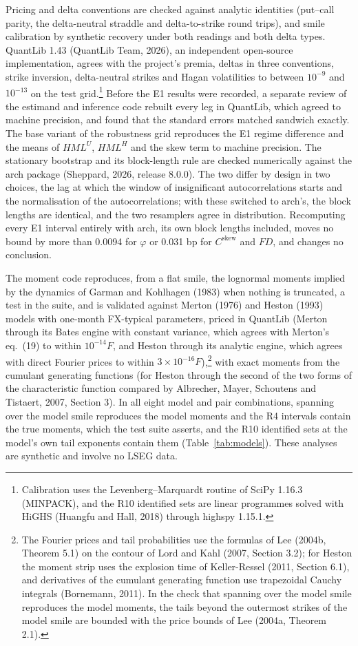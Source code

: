 \documentclass[11pt]{article}
\theoremstyle{result}
\newcommand{\HML}{\mathit{HML}}
\newcommand{\FD}{\mathit{FD}}
\newcommand{\Cskew}{C^{\mathrm{skew}}}
\begin{document}
Pricing and delta conventions are checked against analytic identities (put--call parity, the delta-neutral straddle and delta-to-strike round trips), and smile calibration by synthetic recovery under both readings and both delta types. QuantLib 1.43 (QuantLib Team, 2026), an independent open-source implementation, agrees with the project's premia, deltas in three conventions, strike inversion, delta-neutral strikes and Hagan volatilities to between $10^{-9}$ and $10^{-13}$ on the test grid.\footnote{Calibration uses the Levenberg--Marquardt routine of SciPy 1.16.3 (MINPACK), and the R10 identified sets are linear programmes solved with HiGHS (Huangfu and Hall, 2018) through highspy 1.15.1.} Before the E1 results were recorded, a separate review of the estimand and inference code rebuilt every leg in QuantLib, which agreed to machine precision, and found that the standard errors matched sandwich exactly. The base variant of the robustness grid reproduces the E1 regime difference and the means of $\HML^U$, $\HML^H$ and the skew term to machine precision. The stationary bootstrap and its block-length rule are checked numerically against the arch package (Sheppard, 2026, release 8.0.0). The two differ by design in two choices, the lag at which the window of insignificant autocorrelations starts and the normalisation of the autocorrelations; with these switched to arch's, the block lengths are identical, and the two resamplers agree in distribution. Recomputing every E1 interval entirely with arch, its own block lengths included, moves no bound by more than 0.0094 for $\varphi$ or 0.031 bp for $\Cskew$ and $\FD$, and changes no conclusion.

The moment code reproduces, from a flat smile, the lognormal moments implied by the dynamics of Garman and Kohlhagen (1983) when nothing is truncated, a test in the suite, and is validated against Merton (1976) and Heston (1993) models with one-month FX-typical parameters, priced in QuantLib (Merton through its Bates engine with constant variance, which agrees with Merton's eq.~(19) to within $10^{-14}F$, and Heston through its analytic engine, which agrees with direct Fourier prices to within $3\times10^{-16}F$),\footnote{The Fourier prices and tail probabilities use the formulas of Lee (2004b, Theorem 5.1) on the contour of Lord and Kahl (2007, Section 3.2); for Heston the moment strip uses the explosion time of Keller-Ressel (2011, Section 6.1), and derivatives of the cumulant generating function use trapezoidal Cauchy integrals (Bornemann, 2011). In the check that spanning over the model smile reproduces the model moments, the tails beyond the outermost strikes of the model smile are bounded with the price bounds of Lee (2004a, Theorem 2.1).} with exact moments from the cumulant generating functions (for Heston through the second of the two forms of the characteristic function compared by Albrecher, Mayer, Schoutens and Tistaert, 2007, Section 3). In all eight model and pair combinations, spanning over the model smile reproduces the model moments and the R4 intervals contain the true moments, which the test suite asserts, and the R10 identified sets at the model's own tail exponents contain them (Table~\ref{tab:models}). These analyses are synthetic and involve no LSEG data.
\end{document}
